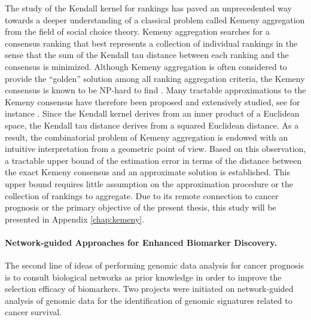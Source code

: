 The study of the Kendall kernel for rankings has paved an unprecedented way towards a deeper understanding of a classical problem called Kemeny aggregation \cite{Kemeny1959Mathematics} from the field of social choice theory. Kemeny aggregation searches for a consensus ranking that best represents a collection of individual rankings in the sense that the sum of the Kendall tau distance between each ranking and the consensus is minimized. Although Kemeny aggregation is often considered to provide the ``golden'' solution among all ranking aggregation criteria, the Kemeny consensus is known to be NP-hard to find \cite{BartholdiIII1989Voting}. Many tractable approximations to the Kemeny consensus have therefore been proposed and extensively studied, see for instance \cite{Ali2012Experiments}. Since the Kendall kernel derives from an inner product of a Euclidean space, the Kendall tau distance derives from a squared Euclidean distance. As a result, the combinatorial problem of Kemeny aggregation is endowed with an intuitive interpretation from a geometric point of view. Based on this observation, a tractable upper bound of the estimation error in terms of the distance between the exact Kemeny consensus and an approximate solution is established. This upper bound requires little assumption on the approximation procedure or the collection of rankings to aggregate. Due to its remote connection to cancer prognosis or the primary objective of the present thesis, this study will be presented in Appendix \ref{chap:kemeny}.


\paragraph{Network-guided Approaches for Enhanced Biomarker Discovery.}

The second line of ideas of performing genomic data analysis for cancer prognosis is to consult biological networks as prior knowledge in order to improve the selection efficacy of biomarkers. Two projects were initiated on network-guided analysis of genomic data for the identification of genomic signatures related to cancer survival.


